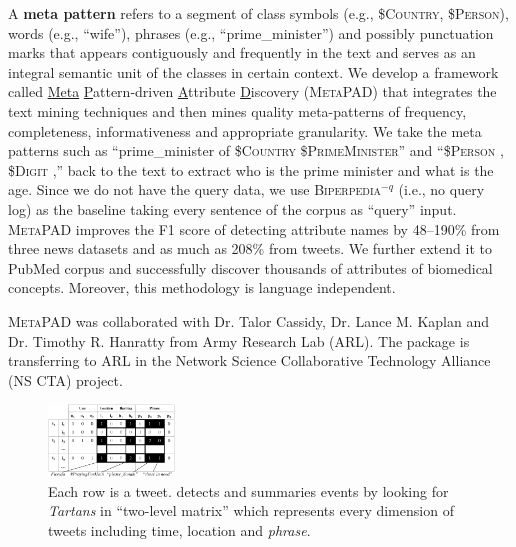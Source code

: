\documentclass[10.5pt]{article}
\begin{document}
A \textbf{meta pattern} refers to a segment of class symbols (e.g., \$\textsc{Country}, \$\textsc{Person}), words (e.g., ``wife''), phrases (e.g., ``prime\_minister'') and possibly punctuation marks that appears contiguously and frequently in the text and serves as an integral semantic unit of the classes in certain context. We develop a framework called \underline{Meta} \underline{P}attern-driven \underline{A}ttribute \underline{D}iscovery (\textsc{MetaPAD}) \cite{jiang2016metapad} that integrates the text mining techniques and then mines quality meta-patterns of frequency, completeness, informativeness and appropriate granularity. We take the meta patterns such as ``prime\_minister of \$\textsc{Country} \$\textsc{PrimeMinister}'' and ``\$\textsc{Person} , \$\textsc{Digit} ,'' back to the text to extract who is the prime minister and what is the age. Since we do not have the query data, we use \textsc{Biperpedia}${}^{-q}$ (i.e., no query log) as the baseline taking every sentence of the corpus as ``query'' input. \textsc{MetaPAD} improves the F1 score of detecting attribute names by 48--190\% from three news datasets and as much as 208\% from tweets. We further extend it to PubMed corpus and successfully discover thousands of attributes of biomedical concepts. Moreover, this methodology is language independent.

\begin{compactitem}
\item \textsc{MetaPAD} was collaborated with Dr. Talor Cassidy, Dr. Lance M. Kaplan and Dr. Timothy R. Hanratty from Army Research Lab (ARL). The package is transferring to ARL in the Network Science Collaborative Technology Alliance (NS CTA) project. 
\end{compactitem}

\vskip 0.05in
\vskip 0.01in


\begin{figure}
\vskip -0.18in
\includegraphics[width=0.3\textwidth]{figure/catchtartan.pdf}
\vskip -0.18in
\caption{Each row is a tweet. \cite{jiang2016catchtartan} detects and summaries events by looking for \textit{Tartans} in ``two-level matrix'' which represents every dimension of tweets including time, location and \textit{phrase}.}
\label{fig:metapad}
\vskip -0.20in
\end{figure}
\end{document}

